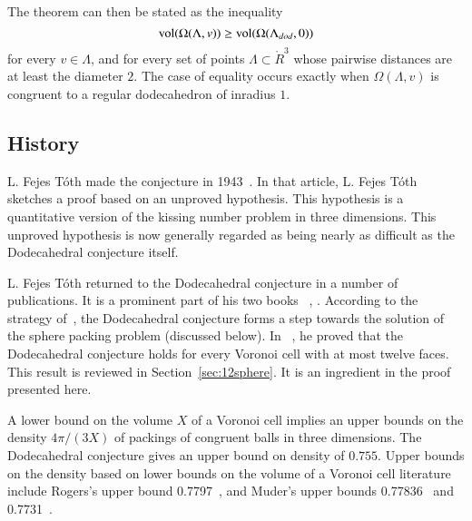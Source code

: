 \documentclass{article} %
\begin{document}
The theorem can then be stated as the inequality
  $$
  {\operatorname{vol}}(\Omega(\Lambda,v)) \ge {\operatorname{vol}}(\Omega(\Lambda_{dod},0))
  $$
for every $v\in\Lambda$, and for every set of points $\Lambda\subset \ring{R}^3$
whose pairwise distances are at least the diameter $2$.
The case of equality occurs exactly when $\Omega(\Lambda,v)$ is
congruent to a regular dodecahedron of inradius $1$.

\subsection{History}

L. Fejes T\'oth made the conjecture in 1943~\cite{Toth:1943:MZ}.  
In that article, L. Fejes T\'oth sketches a proof based on an unproved
hypothesis. This hypothesis is a quantitative version of the kissing
number problem in three dimensions. This unproved hypothesis is now
generally regarded as being nearly as difficult as the Dodecahedral
conjecture itself.

L. Fejes T\'oth returned to the Dodecahedral conjecture in a number of
publications. It is a prominent part of his two books
~\cite{Toth:1972:Lagerungen}, \cite{Toth:1964:Regular}. According to
the strategy of~\cite{Toth:1972:Lagerungen}, the Dodecahedral
conjecture forms a step towards the solution of the sphere packing
problem (discussed below). In~\cite{Toth:1964:Regular} , he proved that the
Dodecahedral conjecture holds for every Voronoi cell with at most
twelve faces. This result is reviewed in Section~\ref{sec:12sphere}.
It is an ingredient in the proof presented here.

\begin{floatingfigure}{30mm}
  \begin{center}
   \end{center}
  \caption{}
\label{fig:dod}
\end{floatingfigure}

A lower bound on the volume $X$ of a Voronoi cell implies
an upper bounds on the density $4\pi/(3X)$ of packings of congruent balls
in three dimensions. The Dodecahedral conjecture gives an upper
bound on density of $0.755$.  
Upper bounds on the density based on lower bounds on the volume of a Voronoi cell
literature include Rogers's upper bound 0.7797~\cite{Rogers:1958:Packing}, and Muder's upper 
bounds 0.77836~\cite{Muder:1988:Voronoi} and 0.7731~\cite{Muder:1993:Bound}.
\end{document}
